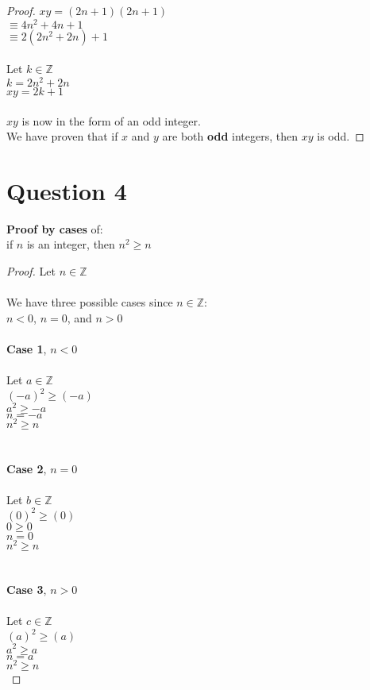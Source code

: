 \documentclass{article}
\begin{document}
\begin{proof}
    $xy = (2n + 1)(2n + 1)$ \\ 
    $\equiv 4n^2 + 4n + 1$ \\
    $\equiv 2(2n^2 + 2n) + 1$\\ \\
    Let $k \in \mathbb{Z}$ \\
    $k = 2n^2 + 2n$ \\
    $xy = 2k + 1$ \\ \\
    $xy$ is now in the form of an odd integer. \\
    We have proven that if $x$ and $y$ are both \textbf{odd} integers, then $xy$ is odd.  \end{proof}
    
    \newpage
    \section*{Question 4}
    \textbf{Proof by cases} of: \\
    \indent if $n$ is an integer, then $n^2 \geq n$ 
    \begin{proof} Let $n \in \mathbb{Z}$ \\ \\
    We have three possible cases since $n \in \mathbb{Z}$: \\
    \indent $n < 0$, $n = 0$, and $n > 0$ \\ \\
    \textbf{Case 1}, $n < 0$ \\ \\
    \indent Let $a \in \mathbb{Z}$ \\
    \indent $(-a)^2 \geq (-a)$ \\
    \indent $a^2 \geq -a$ \\ 
    \indent $n = -a$ \\
    \indent $n^2 \geq n$ \\ \\ \\
    \textbf{Case 2}, $n = 0$ \\ \\
    \indent Let $b \in \mathbb{Z}$ \\
    \indent $(0)^2 \geq (0)$ \\
    \indent $0 \geq 0$ \\ 
    \indent $n = 0$ \\
    \indent $n^2 \geq n$ \\ \\ \\
    \textbf{Case 3}, $n > 0$ \\ \\
    \indent Let $c \in \mathbb{Z}$ \\
    \indent $(a)^2 \geq (a)$ \\
    \indent $a^2 \geq a$ \\ 
    \indent $n = a$ \\
    \indent $n^2 \geq n$  \\ \end{proof}
    
\end{document}

